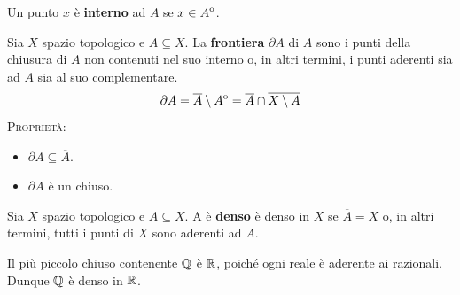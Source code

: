 \begin{define}
	Un punto $x$ è \textbf{interno} ad $A$ se $x\in{\kern0ptA}^{\mathrm{o}}$.
\end{define}
\begin{define}
	Sia $X$ spazio topologico e $A\subseteq X$. La \textbf{frontiera} $\partial A$ di $A$ sono i punti della chiusura di $A$ non contenuti nel suo interno o, in altri termini, i punti aderenti sia ad $A$ sia al suo complementare.
	\begin{equation}
		\partial A=\overline{A}\setminus {\kern0ptA}^{\mathrm{o}}=\overline{A}\cap\overline{X\setminus A}
	\end{equation}
	\textsc{Proprietà:}
	\begin{itemize}
		\item $\partial{A}\subseteq \overline{A}$.
		\item $\partial{A}$ è un chiuso.
	\end{itemize}
\end{define}
\begin{define}
	Sia $X$ spazio topologico e $A\subseteq X$. A è \textbf{denso} è denso in $X$ se $\overline{A}=X$ o, in altri termini, tutti i punti di $X$ sono aderenti ad $A$.
\end{define}
\begin{example}
	Il più piccolo chiuso contenente $\mathbb{Q}$ è $\mathbb{R}$, poiché ogni reale è aderente ai razionali. Dunque $\mathbb{Q}$ è denso in $\mathbb{R}$.
\end{example}
